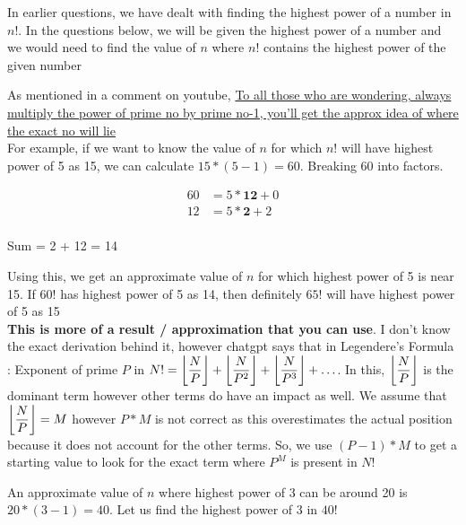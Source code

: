 In earlier questions, we have dealt with finding the highest power of a number in $n!$. In the questions below, we will be given the highest power of a number and we would need to find the value of $n$ where $n!$ contains the highest power of the given number

\begin{NOTE}
    As mentioned in a comment on youtube, \href{https://www.youtube.com/watch?v=sbyU48ZOsVM&list=PLG4bwc5fquzgfMh4YFDnv7fttM0RIKiUQ&index=8}{To all those who are wondering, always multiply the power of prime no by prime no-1, you'll get the approx idea of where the exact no will lie} \\

    For example, if we want to know the value of $n$ for which $n!$ will have highest power of 5 as 15, we can calculate $15 * ( 5 - 1 ) = 60$. Breaking 60 into factors.

    \begin{align*}
        60 &= 5 * \textbf{12} + 0 \\
        12 &= 5 * \textbf{2} + 2 \\
    \end{align*}

    Sum = 2 + 12 = 14

    Using this, we get an approximate value of $n$ for which highest power of 5 is near 15. If $60!$ has highest power of 5 as 14, then definitely $65!$ will have highest power of 5 as 15 \\

    \textbf{This is more of a result / approximation that you can use}. I don't know the exact derivation behind it, however chatgpt says that in Legendere's Formula : Exponent of prime $P$ in $N! = \displaystyle{\left \lfloor {\dfrac{N}{P}} \right \rfloor} + \displaystyle{\left \lfloor {\dfrac{N}{P^2}} \right \rfloor} + \displaystyle{\left \lfloor {\dfrac{N}{P^3}} \right \rfloor} + \ldots$. In this, $\displaystyle{\left \lfloor {\dfrac{N}{P}} \right \rfloor}$ is the dominant term however other terms do have an impact as well. We assume that $\displaystyle{\left \lfloor {\dfrac{N}{P}} \right \rfloor} = M$ however $P * M$ is not correct as this overestimates the actual position because it does not account for the other terms. So, we use $(P-1) * M$ to get a starting value to look for the exact term where $P^M$ is present in $N!$
\end{NOTE}


An approximate value of $n$ where highest power of 3 can be around 20 is $20 * (3-1) = 40$. Let us find the highest power of 3 in $40!$

